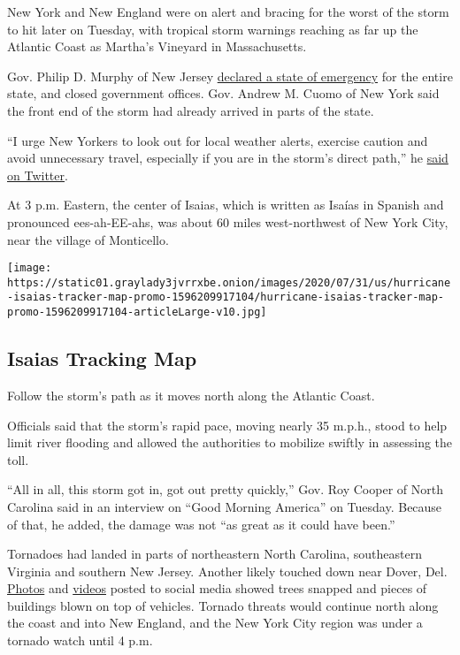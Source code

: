 New York and New England were on alert and bracing for the worst of the
storm to hit later on Tuesday, with tropical storm warnings reaching as
far up the Atlantic Coast as Martha's Vineyard in Massachusetts.

Gov. Philip D. Murphy of New Jersey
\href{https://twitter.com/GovMurphy/status/1290468549232922624}{declared
a state of emergency} for the entire state, and closed government
offices. Gov. Andrew M. Cuomo of New York said the front end of the
storm had already arrived in parts of the state.

``I urge New Yorkers to look out for local weather alerts, exercise
caution and avoid unnecessary travel, especially if you are in the
storm's direct path,'' he
\href{https://twitter.com/NYGovCuomo/status/1290660414666178562}{said on
Twitter}.

At 3 p.m. Eastern, the center of Isaias, which is written as Isaías in
Spanish and pronounced ees-ah-EE-ahs, was about 60 miles west-northwest
of New York City, near the village of Monticello.

\href{https://www.nytimes3xbfgragh.onion/interactive/2020/07/31/us/hurricane-isaias-tracker-map.html}{}

\texttt{[image: https://static01.graylady3jvrrxbe.onion/images/2020/07/31/us/hurricane-isaias-tracker-map-promo-1596209917104/hurricane-isaias-tracker-map-promo-1596209917104-articleLarge-v10.jpg]}

\hypertarget{isaias-tracking-map}{%
\subsection{Isaias Tracking Map}\label{isaias-tracking-map}}

Follow the storm's path as it moves north along the Atlantic Coast.

Officials said that the storm's rapid pace, moving nearly 35 m.p.h.,
stood to help limit river flooding and allowed the authorities to
mobilize swiftly in assessing the toll.

``All in all, this storm got in, got out pretty quickly,'' Gov. Roy
Cooper of North Carolina said in an interview on ``Good Morning
America'' on Tuesday. Because of that, he added, the damage was not ``as
great as it could have been.''

Tornadoes had landed in parts of northeastern North Carolina,
southeastern Virginia and southern New Jersey. Another likely touched
down near Dover, Del.
\href{https://slack-redir.net/link?url=https\%3A\%2F\%2Ftwitter.com\%2FRichWirdzekWx\%2Fstatus\%2F1290684400825438208}{Photos}
and
\href{https://slack-redir.net/link?url=https\%3A\%2F\%2Ftwitter.com\%2FDKDRinc\%2Fstatus\%2F1290688365830995969}{videos}
posted to social media showed trees snapped and pieces of buildings
blown on top of vehicles. Tornado threats would continue north along the
coast and into New England, and the New York City region was under a
tornado watch until 4 p.m.

